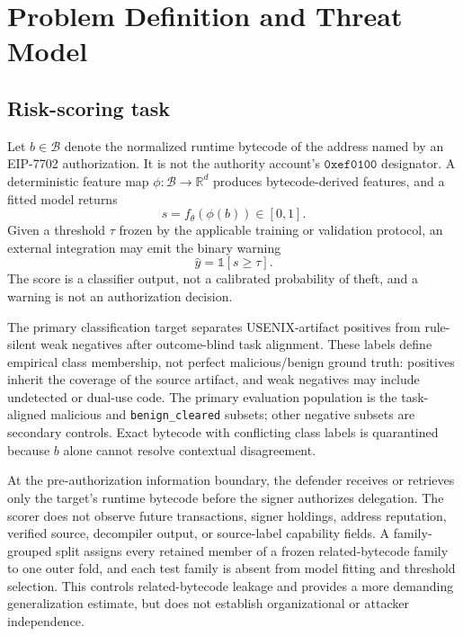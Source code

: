 \section{Problem Definition and Threat Model}
\label{sec:problem_threat}

\subsection{Risk-scoring task}

Let $b\in\mathcal{B}$ denote the normalized runtime bytecode of the address named by an EIP-7702 authorization. It is not the authority account's $\mathtt{0xef0100}$ designator. A deterministic feature map $\phi:\mathcal{B}\rightarrow\mathbb{R}^{d}$ produces bytecode-derived features, and a fitted model returns
\begin{equation}
  s=f_{\theta}(\phi(b))\in[0,1].
\end{equation}
Given a threshold $\tau$ frozen by the applicable training or validation protocol, an external integration may emit the binary warning
\begin{equation}
  \hat{y}=\mathbb{1}[s\geq\tau].
\end{equation}
The score is a classifier output, not a calibrated probability of theft, and a warning is not an authorization decision.

The primary classification target separates USENIX-artifact positives from rule-silent weak negatives after outcome-blind task alignment. These labels define empirical class membership, not perfect malicious/benign ground truth: positives inherit the coverage of the source artifact, and weak negatives may include undetected or dual-use code. The primary evaluation population is the task-aligned malicious and \texttt{benign\_cleared} subsets; other negative subsets are secondary controls. Exact bytecode with conflicting class labels is quarantined because $b$ alone cannot resolve contextual disagreement.

At the pre-authorization information boundary, the defender receives or retrieves only the target's runtime bytecode before the signer authorizes delegation. The scorer does not observe future transactions, signer holdings, address reputation, verified source, decompiler output, or source-label capability fields. A family-grouped split assigns every retained member of a frozen related-bytecode family to one outer fold, and each test family is absent from model fitting and threshold selection. This controls related-bytecode leakage and provides a more demanding generalization estimate, but does not establish organizational or attacker independence.

